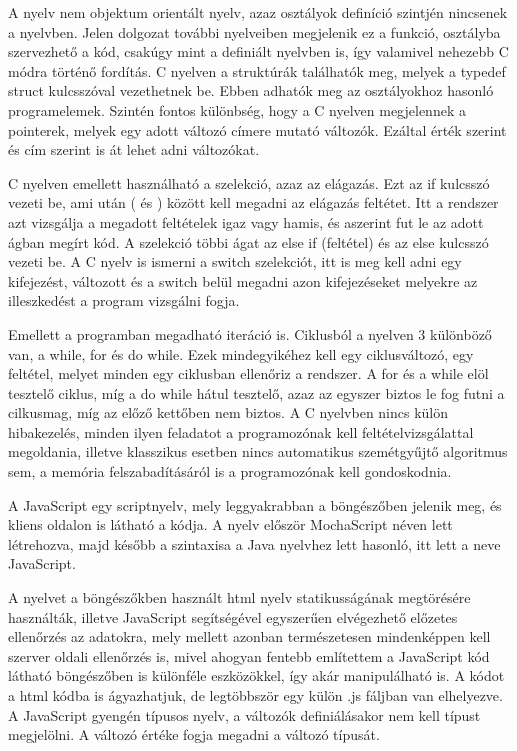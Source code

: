 A nyelv nem objektum orientált nyelv, azaz osztályok definíció szintjén nincsenek a nyelvben. Jelen dolgozat további nyelveiben megjelenik ez a funkció, osztályba szervezhető a kód, csakúgy mint a definiált nyelvben is, így valamivel nehezebb C módra történő fordítás. C nyelven a struktúrák találhatók meg, melyek a typedef struct kulcsszóval vezethetnek be. Ebben adhatók meg az osztályokhoz hasonló programelemek. Szintén fontos különbség, hogy a C nyelven megjelennek a pointerek, melyek egy adott változó címere mutató változók. Ezáltal érték szerint és cím szerint is át lehet adni változókat.

C nyelven emellett használható a szelekció, azaz az elágazás. Ezt az if kulcsszó vezeti be, ami után ( és ) között kell megadni az elágazás feltétet. Itt a rendszer azt vizsgálja a megadott feltételek igaz vagy hamis, és aszerint fut le az adott ágban megírt kód. A szelekció többi ágat az else if (feltétel) és az else kulcsszó vezeti be. A C nyelv is ismerni a switch szelekciót, itt is meg kell adni egy kifejezést, változott és a switch belül megadni azon kifejezéseket melyekre az illeszkedést a program vizsgálni fogja.

Emellett a programban megadható iteráció is. Ciklusból a nyelven 3 különböző van, a while, for és do while. Ezek mindegyikéhez kell egy ciklusváltozó, egy feltétel, melyet minden egy ciklusban ellenőriz a rendszer. A for és a while elöl tesztelő ciklus, míg a do while hátul tesztelő, azaz az egyszer biztos le fog futni a cilkusmag, míg az előző kettőben nem biztos. A C nyelvben nincs külön hibakezelés, minden ilyen feladatot a programozónak kell feltételvizsgálattal megoldania, illetve klasszikus esetben nincs automatikus szemétgyűjtő algoritmus sem, a memória felszabadításáról is a programozónak kell gondoskodnia.

A JavaScript egy scriptnyelv, mely leggyakrabban a böngészőben jelenik meg, és kliens oldalon is látható a kódja. A nyelv először MochaScript néven lett létrehozva, majd később a szintaxisa a Java nyelvhez lett hasonló, itt lett a neve JavaScript.

A nyelvet a böngészőkben használt html nyelv statikusságának megtörésére használták, illetve JavaScript segítségével egyszerűen elvégezhető előzetes ellenőrzés az adatokra, mely mellett azonban természetesen mindenképpen kell szerver oldali ellenőrzés is, mivel ahogyan fentebb említettem a JavaScript kód látható böngészőben is különféle eszközökkel, így akár manipulálható is. A kódot a html kódba is ágyazhatjuk, de legtöbbször egy külön .js fáljban van elhelyezve. A JavaScript gyengén típusos nyelv, a változók definiálásakor nem kell típust megjelölni. A változó értéke fogja megadni a változó típusát.

